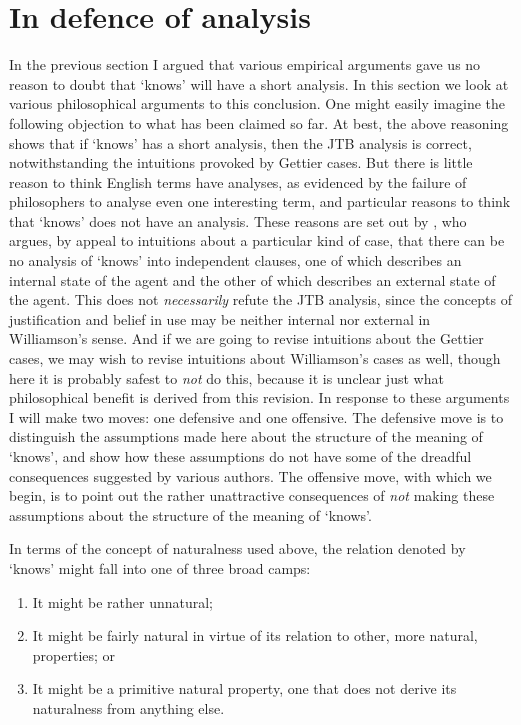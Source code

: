\section{In defence of analysis}

In the previous section I argued that various empirical arguments gave us no reason to doubt that `knows' will have a short analysis. In this section we look at various philosophical arguments to this conclusion. One might easily imagine the following objection to what has been claimed so far. At best, the above reasoning shows that if `knows' has a short analysis, then the JTB analysis is correct, notwithstanding the intuitions provoked by Gettier cases. But there is little reason to think English terms have analyses, as evidenced by the failure of philosophers to analyse even one interesting term, and particular reasons to think that `knows' does not have an analysis. These reasons are set out by \cite[Ch. 3]{Williamson2000-WILKAI}, who argues, by appeal to intuitions about a particular kind of case, that there can be no analysis of `knows' into independent clauses, one of which describes an internal state of the agent and the other of which describes an external state of the agent. This does not \textit{necessarily} refute the JTB analysis, since the concepts of justification and belief in use may be neither internal nor external in Williamson's sense. And if we are going to revise intuitions about the Gettier cases, we may wish to revise intuitions about Williamson's cases as well, though here it is probably safest to \textit{not} do this, because it is unclear just what philosophical benefit is derived from this revision. In response to these arguments I will make two moves: one defensive and one offensive. The defensive move is to distinguish the assumptions made here about the structure of the meaning of `knows', and show how these assumptions do not have some of the dreadful consequences suggested by various authors. The offensive move, with which we begin, is to point out the rather unattractive consequences of \textit{not} making these assumptions about the structure of the meaning of `knows'.

In terms of the concept of naturalness used above, the relation denoted by `knows' might fall into one of three broad camps:

\begin{enumerate}
\renewcommand{\labelenumi}{(\alph{enumi})}
\item It might be rather unnatural;
\item It might be fairly natural in virtue of its relation to other, more natural, properties; or
\item It might be a primitive natural property, one that does not derive its naturalness from anything else.
\end{enumerate}

